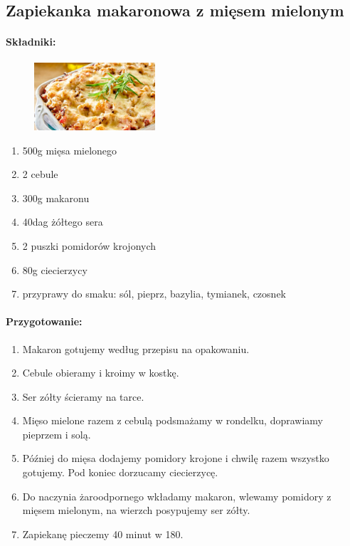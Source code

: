 \documentclass{article}
\begin{document}
    \subsection{Zapiekanka makaronowa z mięsem mielonym}
    \bigskip
    \paragraph{Składniki:}
    \begin{figure}
        \includegraphics[width=0.4\textwidth]{zapiekanka_makaronowa.jpg}
    \end{figure}
    \begin{enumerate}
        \item 500g mięsa mielonego
        \item 2 cebule
        \item 300g makaronu
        \item 40dag żółtego sera
        \item 2 puszki pomidorów krojonych
        \item 80g ciecierzycy
        \item przyprawy do smaku: sól, pieprz, bazylia, tymianek, czosnek
    \end{enumerate}

    \paragraph{Przygotowanie:}
    \begin{enumerate}
        \item Makaron gotujemy według przepisu na opakowaniu.
        \item Cebule obieramy i kroimy w kostkę.
        \item Ser zółty ścieramy na tarce.
        \item Mięso mielone razem z cebulą podsmażamy w rondelku, doprawiamy
            pieprzem i solą.
        \item Później do mięsa dodajemy pomidory krojone i chwilę razem wszystko
            gotujemy. Pod koniec dorzucamy ciecierzycę.
        \item Do naczynia żaroodpornego wkładamy makaron, wlewamy pomidory z
            mięsem mielonym, na wierzch posypujemy ser zółty.
        \item Zapiekanę pieczemy 40 minut w 180\celsius.
    \end{enumerate}
    \newpage
\end{document}
